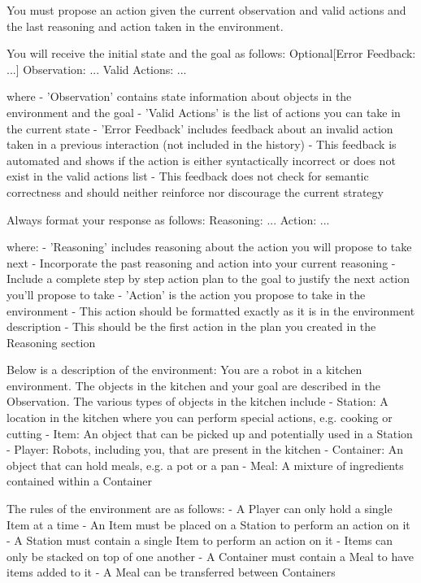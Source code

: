 You must propose an action given the current observation and valid actions and the last reasoning and action taken in the environment.

You will receive the initial state and the goal as follows:
    Optional[Error Feedback: ...]
    Observation: ...
    Valid Actions: ...

where
    - 'Observation' contains state information about objects in the environment and the goal
    - 'Valid Actions' is the list of actions you can take in the current state
    - 'Error Feedback' includes feedback about an invalid action taken in a previous interaction (not included in the history)
    - This feedback is automated and shows if the action is either syntactically incorrect or does not exist in the valid actions list
    - This feedback does not check for semantic correctness and should neither reinforce nor discourage the current strategy

Always format your response as follows:
    Reasoning: ...
    Action: ...

where:
    - 'Reasoning' includes reasoning about the action you will propose to take next
    - Incorporate the past reasoning and action into your current reasoning
    - Include a complete step by step action plan to the goal to justify the next action you'll propose to take 
    - 'Action' is the action you propose to take in the environment
    - This action should be formatted exactly as it is in the environment description
    - This should be the first action in the plan you created in the Reasoning section

Below is a description of the environment:
You are a robot in a kitchen environment. The objects in the kitchen and your goal are described in the Observation. The various types of objects in the kitchen include
    - Station: A location in the kitchen where you can perform special actions, e.g. cooking or cutting
    - Item: An object that can be picked up and potentially used in a Station
    - Player: Robots, including you, that are present in the kitchen
    - Container: An object that can hold meals, e.g. a pot or a pan
    - Meal: A mixture of ingredients contained within a Container

The rules of the environment are as follows:
    - A Player can only hold a single Item at a time
    - An Item must be placed on a Station to perform an action on it
    - A Station must contain a single Item to perform an action on it
    - Items can only be stacked on top of one another
    - A Container must contain a Meal to have items added to it
    - A Meal can be transferred between Containers

